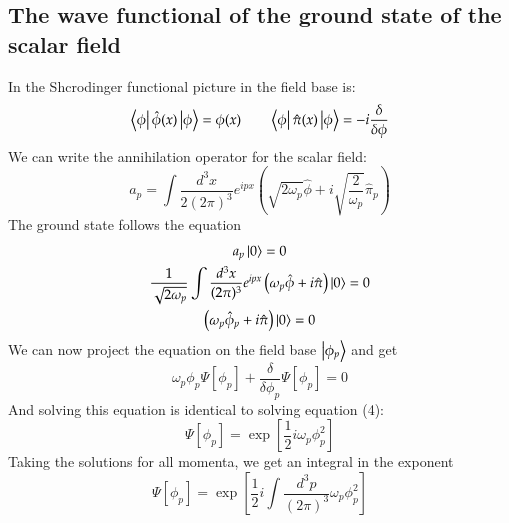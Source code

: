 \documentclass{article}
\begin{document}
\subsection{The wave functional of the ground state of the scalar field}
In the Shcrodinger functional picture in the field base is:
\begin{equation}
    \bra{\phi}\hat{\phi}(x)\ket{\phi} = \phi(x) \qquad \bra{\phi}\hat{\pi}(x)\ket{\phi} = -i \frac{\delta}{\delta\phi}
\end{equation}
We can write the annihilation operator for the scalar field:
\begin{equation}
    a_p = \int \frac{d^3x}{2(2\pi)^3} e^{ipx} \left(\sqrt{2\omega_p}\hat{\phi} + i\sqrt{\frac{2}{\omega_p}}\hat{\pi}_p\right)
\end{equation}
The ground state follows the equation
\begin{equation}
\begin{gathered}
    a_p\ket{0} = 0
    \\
    \frac{1}{\sqrt{2\omega_p}} \int \frac{d^3x}{(2\pi)^3} e^{ipx} \left(\omega_p\hat{\phi} + i\hat{\pi}\right)\ket{0} = 0
    \\
    \left(\omega_p\hat{\phi}_p + i\hat{\pi}\right)\ket{0} = 0
\end{gathered}
\end{equation}
We can now project the equation on the field base $\ket{\phi_p}$ and get
\begin{equation}
    \omega_p \phi_p \Psi[\phi_p] + \frac{\delta}{\delta\phi_p}\Psi[\phi_p] = 0
\end{equation}
And solving this equation is identical to solving equation (4):
\begin{equation}
    \Psi[\phi_p] = \exp\left[\frac{1}{2}i \omega_p \phi_p^2\right]
\end{equation}
Taking the solutions for all momenta, we get an integral in the exponent
\begin{equation}
    \Psi[\phi_p] = \exp\left[\frac{1}{2}i \int \frac{d^3p}{(2\pi)^3} \omega_p \phi_p^2\right]
\end{equation}
\end{document}
